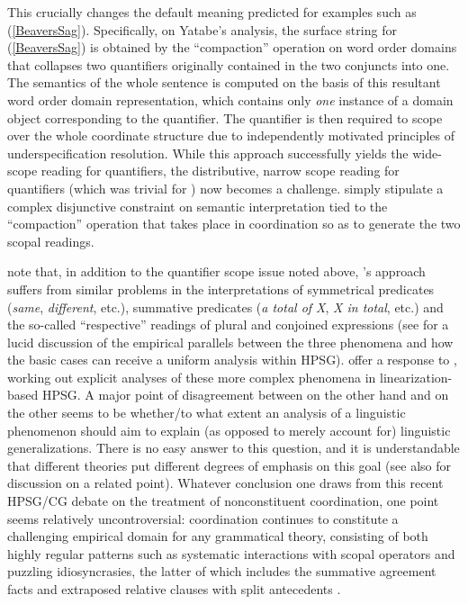 \documentclass[output=paper
                ,modfonts
 	        ,biblatex
                ,babelshorthands
                ,newtxmath
                ,draftmode
                ,colorlinks, citecolor=brown
]{langscibook}
\begin{document}
This crucially changes the default meaning predicted for examples such
as (\ref{BeaversSag}). Specifically, on Yatabe's analysis, the surface
string for (\ref{BeaversSag}) is obtained by the ``compaction''
operation on word order domains that collapses two quantifiers
originally contained in the two conjuncts into one. The semantics of
the whole sentence is computed on the basis of this resultant word
order domain representation, which contains only \emph{one} instance
of a domain object corresponding to the quantifier. The quantifier is
then required to scope over the whole coordinate structure due to
independently motivated principles of underspecification resolution.
While this approach successfully yields the wide-scope reading for
quantifiers, the distributive, narrow scope reading for quantifiers
(which was trivial for \citeauthor{BS2004a}) now becomes a challenge.
\citeauthor{yatabe-tam2017} simply stipulate a complex disjunctive constraint on semantic
interpretation tied to the ``compaction'' operation that takes place in
coordination so as to generate the two scopal readings.

\citet[Section~3.2.2]{kubota-levine-coord} note that, in addition to the quantifier
scope issue noted above, \citeauthor{BS2004a}'s approach suffers from similar problems
in the interpretations of symmetrical predicates (\textit{same},
\textit{different}, etc.), summative predicates (\textit{a total of
X}, \textit{X in total}, etc.) and the so-called ``respective'' readings
of plural and conjoined expressions (see \citealt{chaves12} for a lucid
discussion of the empirical parallels between the three phenomena and
how the basic cases can receive a uniform analysis within HPSG).
\citet{yatabe-tam2017} offer a response to \citeauthor{kubota-levine-coord}, working out explicit
analyses of these more complex phenomena in linearization-based HPSG.
A major point of disagreement between \citeauthor{kubota-levine-coord} on the other
hand and \citeauthor{yatabe-tam2017} on the other seems to be
whether/to what extent an analysis of a linguistic phenomenon
should aim to explain (as opposed to merely account for)
linguistic generalizations. There is no easy answer to this
question, and it is understandable that different theories put
different degrees of emphasis on this goal (see also
 for discussion on a related point).
Whatever conclusion one draws from this recent HPSG/CG debate on
the treatment of nonconstituent coordination, one point seems 
relatively uncontroversial: coordination continues to constitute a challenging
empirical domain for any grammatical theory,
consisting of both highly regular patterns such as systematic
interactions with scopal operators
\citep{kubota-levine-coord,KubotaLevineBook} and puzzling
idiosyncrasies, the latter of which includes the summative agreement
facts \citep{postalextraction,yatabe-tam2017} and extraposed relative
clauses with split antecedents
\citep{PerlmutterRoss70,Link84a-u,Kiss2005a,yatabe-tam2017}.
\end{document}
